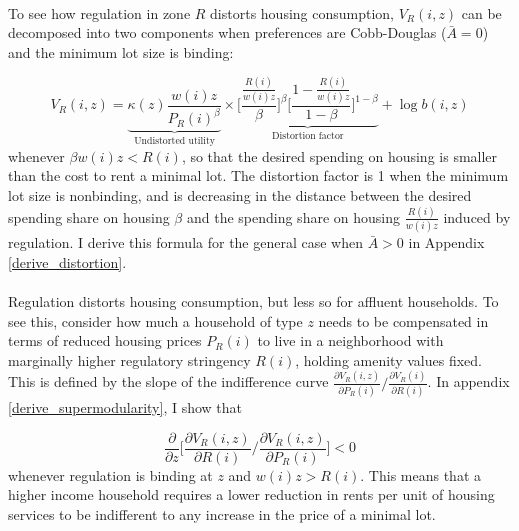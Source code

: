 \documentclass[12pt]{article}
\begin{document}
	\paragraph*{}
	To see how regulation in zone $R$ distorts housing consumption, $V_{R}(i, z)$ can be decomposed into two components when preferences are Cobb-Douglas ($\bar{A} = 0$) and the minimum lot size is binding:
	
	\begin{equation}\label{utilitydecomp}
		V_{R}(i, z) = \underbrace{\kappa(z)\frac{w(i)z}{P_{R}(i)^{\beta}}}_{\text{Undistorted utility}}  \times \underbrace{\biggl[\frac{\frac{R(i)}{w(i)z}}{\beta}\biggl]^{\beta}\biggl[\frac{1- \frac{R(i)}{w(i)z}}{1-\beta}\biggl]^{1 - \beta}}_{\text{Distortion factor}} + \log b(i, z)
	\end{equation}
	whenever $\beta w(i)z < R(i)$, so that the desired spending on housing is smaller than the cost to rent a minimal lot. The distortion factor is 1 when the minimum lot size is nonbinding, and is decreasing in the distance between the desired spending share on housing $\beta$ and the spending share on housing $\frac{R(i)}{w(i)z}$ induced by regulation. I derive this formula for the general case when $\bar{A} > 0$ in Appendix \ref{derive_distortion}. 
	
	\paragraph*{}
	Regulation distorts housing consumption, but less so for affluent households. To see this, consider how much a household of type $z$ needs to be compensated in terms of reduced housing prices $P_{R}(i)$ to live in a neighborhood with marginally higher regulatory stringency $R(i)$, holding amenity values fixed. This is defined by the slope of the indifference curve $\frac{\partial V_{R}(i, z)}{\partial P_{R}(i)}/\frac{\partial V_{R}(i)}{\partial R(i)}$. In appendix \ref{derive_supermodularity}, I show that 
	
	\begin{equation}\label{supermodularity}
		\frac{\partial}{\partial z}\bigg[\frac{\partial V_{R}(i, z)}{\partial R(i)}/\frac{\partial V_{R}(i, z)}{\partial P_{R}(i)}\bigg] < 0
	\end{equation}
	whenever regulation is binding at $z$ and $w(i)z > R(i)$. This means that a higher income household requires a lower reduction in rents per unit of housing services to be indifferent to any increase in the price of a minimal lot. 
\end{document}
